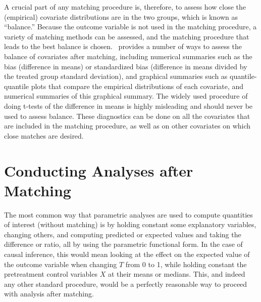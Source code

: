 A crucial part of any matching procedure is, therefore, to assess how
close the (empirical) covariate distributions are in the two groups,
which is known as ``balance.''  Because the outcome variable is not
used in the matching procedure, a variety of matching methods can be
assessed, and the matching procedure that leads to the best balance is
chosen.  \MatchIt\ provides a number of ways to assess the balance of
covariates after matching, including numerical summaries such as the
bias (difference in means) or standardized bias (difference in means
divided by the treated group standard deviation), and graphical
summaries such as quantile-quantile plots that compare the empirical
distributions of each covariate, and numerical summaries of this
graphical summary.  The widely used procedure of doing t-tests of the
difference in means is highly misleading and should never be used to
assess balance.  These diagnostics can be done on all the covariates
that are included in the matching procedure, as well as on other
covariates on which close matches are desired.

\section{Conducting Analyses after Matching}

The most common way that parametric analyses are used to compute
quantities of interest (without matching) is by holding constant some
explanatory variables, changing others, and computing predicted or
expected values and taking the difference or ratio, all by using the
parametric functional form.  In the case of causal inference, this
would mean looking at the effect on the expected value of the outcome
variable when changing $T$ from 0 to 1, while holding constant the
pretreatment control variables $X$ at their means or medians.  This,
and indeed any other standard procedure, would be a perfectly
reasonable way to proceed with analysis after matching.


